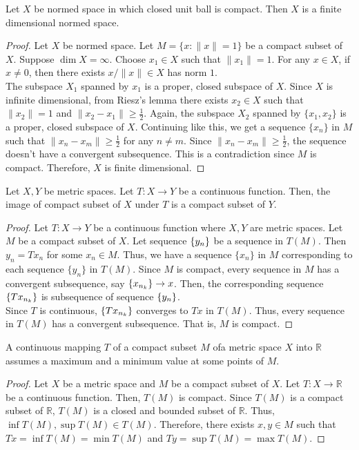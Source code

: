 \begin{theorem}
	Let $X$ be normed space in which closed unit ball is compact.
	Then $X$ is a finite dimensional normed space.
\end{theorem}
\begin{proof}
	Let $X$ be normed space.
	Let $M = \{ x : \| x \| = 1 \}$ be a compact subset of $X$.
	Suppose $\dim X =\infty$.
	Choose $x_1 \in X$ such that $\|x_1\| = 1$.
	For any $x \in X$, if $x \ne 0$, then there exists $x/\|x\| \in X$ has norm $1$.\\

	The subspace $X_1$ spanned by $x_1$ is a proper, closed subspace of $X$.
	Since $X$ is infinite dimensional, from Riesz's lemma there exists $x_2 \in X$ such that $\| x_2 \| = 1$ and $\|x_2-x_1\| \ge \frac{1}{2}$.
	Again, the subspace $X_2$ spanned by $\{x_1,x_2\}$ is a proper, closed subspace of $X$.
	Continuing like this, we get a sequence $\{x_n\}$ in $M$ such that $\|x_n-x_m\| \ge \frac{1}{2}$ for any $n \ne m$.
	Since $\|x_n-x_m\| \ge \frac{1}{2}$, the sequence doesn't have a convergent subsequence.
	This is a contradiction since $M$ is compact.
	Therefore, $X$ is finite dimensional.
\end{proof}

\begin{theorem}
	Let $X,Y$ be metric spaces.
	Let $T : X \to Y$ be a continuous function.
	Then, the image of compact subset of $X$ under $T$ is a compact subset of $Y$.
\end{theorem}
\begin{proof}
	Let $T : X \to Y$ be a continuous function where $X,Y$ are metric spaces.
	Let $M$ be a compact subset of $X$.
	Let sequence $\left\{y_n\right\}$ be a sequence in $T(M)$.
	Then $y_n = Tx_n$ for some $x_n \in M$.
	Thus, we have a sequence $\{ x_n \}$ in $M$ corresponding to each sequence $\{ y_n \}$ in $T(M)$.
	Since $M$ is compact, every sequence in $M$ has a convergent subsequence, say $\left\{x_{n_k}\right\} \to x$.
	Then, the corresponding sequence $\left\{Tx_{n_k}\right\}$ is subsequence of sequence $\left\{y_n\right\}$.\\

	Since $T$ is continuous, $\left\{Tx_{n_k}\right\}$ converges to $Tx$ in $T(M)$.
	Thus, every sequence in $T(M)$ has a convergent subsequence.
	That is, $M$ is compact.
\end{proof}

\begin{corollary}
	A continuous mapping $T$ of a compact subset $M$ ofa metric space $X$ into $\mathbb{R}$ assumes a maximum and a minimum value at some points of $M$.
\end{corollary}
\begin{proof}
	Let $X$ be a metric space and $M$ be a compact subset of $X$.
	Let $T : X \to \mathbb{R}$ be a continuous function.
	Then, $T(M)$ is compact.
	Since $T(M)$ is a compact subset of $\mathbb{R}$, $T(M)$ is a closed and bounded subset of $\mathbb{R}$.
	Thus, $\inf T(M), \sup T(M) \in T(M)$.
	Therefore, there exists $x,y \in M$ such that $Tx=\inf T(M) = \min T(M)$ and $Ty = \sup T(M) = \max T(M)$.
\end{proof}

